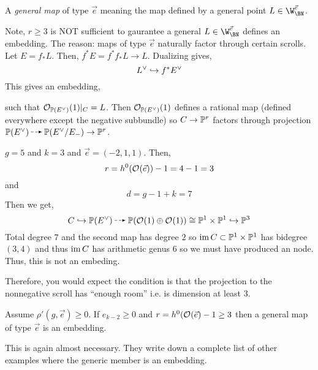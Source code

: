 \documentclass[12pt]{article}
\begin{document}
\begin{defn}
A \textit{general map} of type $\vec{e}$ meaning the map defined by a general point $L \in \W^{\vec{e}}_{\BN}$.
\end{defn}

\begin{rmk}
Note, $r \ge 3$ is NOT sufficient to gaurantee a general $L \in \W^{\vec{e}}_{\BN}$ defines an embedding. The reason: maps of type $\vec{e}$ naturally factor through certain scrolls. Let $E = f_* L$. Then, $f^* E = f^* f_* L \to L$. Dualizing gives,
\[ L^\vee \embed f^* E^\vee \]
This gives an embedding,
\begin{center}
\end{center}
such that $\struct{\P(E^\vee)}(1)|_C = L$. Then $\struct{\P(E^\vee)}(1)$ defines a rational map (defined everywhere except the negative subbundle) so $C \to \P^r$ factors through projection $\P(E^\vee) \rat \P(E^\vee/E_{-}) \to \P^r$. 
\end{rmk}

\begin{example}
$g = 5$ and $k = 3$ and $\vec{e} = (-2,1,1)$. Then,
\[ r = h^0(\struct{}(\vec{e})) - 1 = 4 - 1 = 3 \]
and
\[ d = g - 1 + k = 7 \]
Then we get,
\[ C \embed \P(E^\vee) \rat \P(\struct{}(1) \oplus \struct{}(1)) \cong \P^1 \times \P^1 \embed \P^3 \]
Total degree $7$ and the second map has degree $2$ so $\im{C} \subset \P^1 \times \P^1$ has bidegree $(3,4)$ and thus $\im{C}$ has arithmetic genus $6$ so we must have produced an node. Thus, this is not an embeding. 
\end{example}

\begin{rmk}
Therefore, you would expect the condition is that the projection to the nonnegative scroll has ``enough room'' i.e. is dimension at least $3$. 
\end{rmk}

\begin{theorem}
Assume $\rho'(g, \vec{e}) \ge 0$. If $e_{k-2} \ge 0$ and $r = h^0(\struct{}(\vec{e}) - 1 \ge 3$ then a general map of type $\vec{e}$ is an embedding.
\end{theorem}

\begin{rmk}
This is again almost necessary. They write down a complete list of other examples where the generic member is an embedding. 
\end{rmk}
\end{document}
